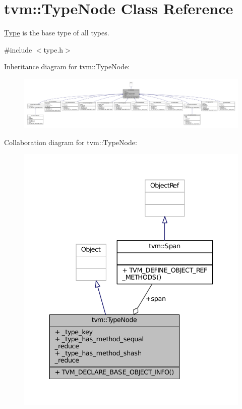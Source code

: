 \hypertarget{classtvm_1_1TypeNode}{}\section{tvm\+:\+:Type\+Node Class Reference}
\label{classtvm_1_1TypeNode}


\hyperlink{classtvm_1_1Type}{Type} is the base type of all types.  




{\ttfamily \#include $<$type.\+h$>$}



Inheritance diagram for tvm\+:\+:Type\+Node\+:
\nopagebreak
\begin{figure}[H]
\begin{center}
\leavevmode
\includegraphics[width=350pt]{classtvm_1_1TypeNode__inherit__graph}
\end{center}
\end{figure}


Collaboration diagram for tvm\+:\+:Type\+Node\+:
\nopagebreak
\begin{figure}[H]
\begin{center}
\leavevmode
\includegraphics[width=336pt]{classtvm_1_1TypeNode__coll__graph}
\end{center}
\end{figure}
